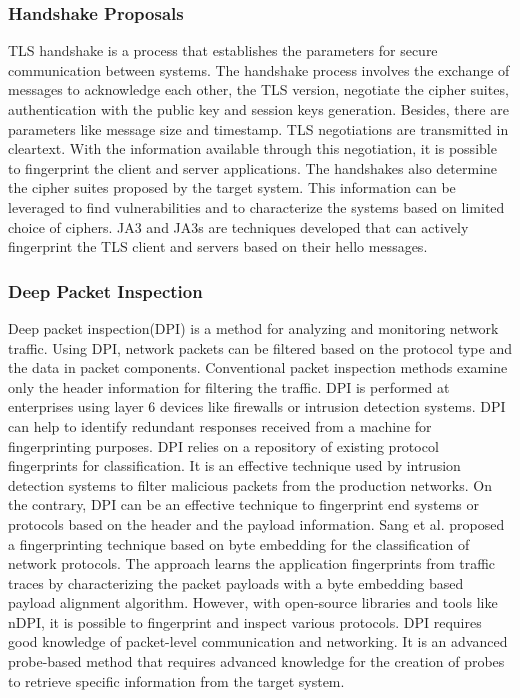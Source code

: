 \subsubsection{Handshake Proposals}
TLS handshake is a process that establishes the parameters for secure communication between systems. The handshake process involves the exchange of messages to acknowledge each other, the TLS version,  negotiate the cipher suites, authentication with the public key and session keys generation. Besides, there are parameters like message size and timestamp. TLS negotiations are transmitted in cleartext. With the information available through this negotiation, it is possible to fingerprint the client and server applications.  The handshakes also determine the cipher suites proposed by the target system. This information can be leveraged to find vulnerabilities and to characterize the systems based on limited choice of ciphers. JA3 and JA3s\cite{JA3} are techniques developed that can actively fingerprint the TLS client and servers based on their hello messages.
\newline
\subsubsection{Deep Packet Inspection}
Deep packet inspection(DPI) is a method for analyzing and monitoring network traffic. Using DPI, network packets can be filtered based on the protocol type and the data in packet components. Conventional packet inspection methods examine only the header information for filtering the traffic. DPI is performed at enterprises using layer 6 devices like firewalls or intrusion detection systems. DPI can help to identify redundant responses received from a machine for fingerprinting purposes. DPI relies on a repository of existing protocol fingerprints for classification. It is an effective technique used by intrusion detection systems to filter malicious packets from the production networks. On the contrary, DPI can be an effective technique to fingerprint end systems or protocols based on the header and the payload information. Sang et al.\cite{Sang} proposed a fingerprinting technique based on byte embedding for the classification of network protocols. The approach learns the application fingerprints from traffic traces by characterizing the packet payloads with a byte embedding based payload alignment algorithm. However, with open-source libraries and tools like nDPI\cite{nDPI}, it is possible to fingerprint and inspect various protocols. DPI requires good knowledge of packet-level communication and networking. It is an advanced probe-based method that requires advanced knowledge for the creation of probes to retrieve specific information from the target system.  
\newline

